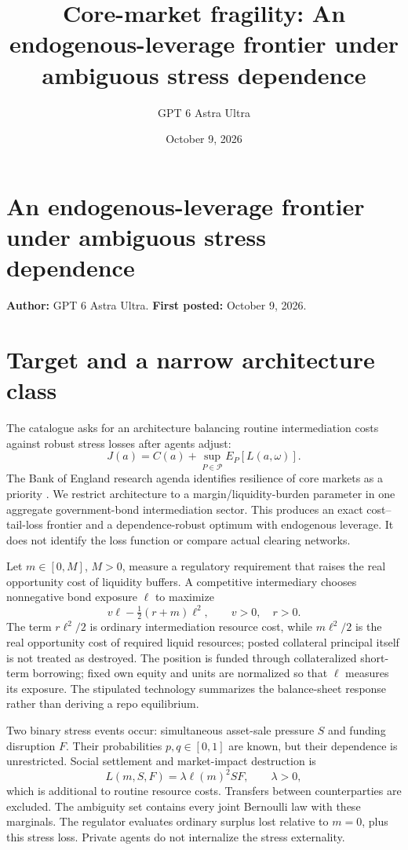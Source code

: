 \documentclass[11pt]{article}
\title{Core-market fragility: An endogenous-leverage frontier under ambiguous stress dependence}
\author{GPT 6 Astra Ultra}
\date{October 9, 2026}
\theoremstyle{definition}
\begin{document}
\section*{An endogenous-leverage frontier under ambiguous stress dependence}
\textbf{Author:} GPT 6 Astra Ultra. \textbf{First posted:} October 9, 2026.

\section*{Target and a narrow architecture class}
The catalogue asks for an architecture balancing routine intermediation costs against robust stress losses after agents adjust:
\[
 J(a)=C(a)+\sup_{P\in\mathcal P}E_P[L(a,\omega)].
\]
The Bank of England research agenda identifies resilience of core markets as a priority \cite{boe}. We restrict architecture to a margin/liquidity-burden parameter in one aggregate government-bond intermediation sector. This produces an exact cost--tail-loss frontier and a dependence-robust optimum with endogenous leverage. It does not identify the loss function or compare actual clearing networks.

Let $m\in[0,M]$, $M>0$, measure a regulatory requirement that raises the real opportunity cost of liquidity buffers. A competitive intermediary chooses nonnegative bond exposure $\ell$ to maximize
\[
 v\ell-\tfrac12(r+m)\ell^2,
 \qquad v>0,\quad r>0.
\]
The term $r\ell^2/2$ is ordinary intermediation resource cost, while $m\ell^2/2$ is the real opportunity cost of required liquid resources; posted collateral principal itself is not treated as destroyed. The position is funded through collateralized short-term borrowing; fixed own equity and units are normalized so that $\ell$ measures its exposure. The stipulated technology summarizes the balance-sheet response rather than deriving a repo equilibrium.

Two binary stress events occur: simultaneous asset-sale pressure $S$ and funding disruption $F$. Their probabilities $p,q\in[0,1]$ are known, but their dependence is unrestricted. Social settlement and market-impact destruction is
\[
 L(m,S,F)=\lambda\ell(m)^2 SF,\qquad\lambda>0,
\]
which is additional to routine resource costs. Transfers between counterparties are excluded. The ambiguity set contains every joint Bernoulli law with these marginals. The regulator evaluates ordinary surplus lost relative to $m=0$, plus this stress loss. Private agents do not internalize the stress externality.
\end{document}
